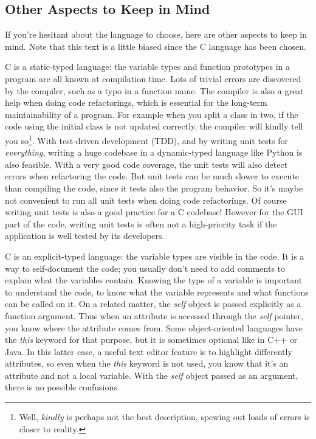 \subsection{Other Aspects to Keep in Mind}
If you're hesitant about the language to choose, here are other aspects to keep in mind. Note that this text is a little biased since the C language has been chosen.

C is a static-typed language: the variable types and function prototypes in a program are all known at compilation time. Lots of trivial errors are discovered by the compiler, such as a typo in a function name. The compiler is also a great help when doing code refactorings, which is essential for the long-term maintainability of a program. For example when you split a class in two, if the code using the initial class is not updated correctly, the compiler will kindly tell you so\footnote{Well, \emph{kindly} is perhaps not the best description, spewing out loads of errors is closer to reality.}. With test-driven development (TDD), and by writing unit tests for \emph{everything}, writing a huge codebase in a dynamic-typed language like Python is also feasible. With a very good code coverage, the unit tests will also detect errors when refactoring the code. But unit tests can be much slower to execute than compiling the code, since it tests also the program behavior. So it's maybe not convenient to run all unit tests when doing code refactorings. Of course writing unit tests is also a good practice for a C codebase! However for the GUI part of the code, writing unit tests is often not a high-priority task if the application is well tested by its developers.

C is an explicit-typed language: the variable types are visible in the code. It is a way to self-document the code; you usually don't need to add comments to explain what the variables contain. Knowing the type of a variable is important to understand the code, to know what the variable represents and what functions can be called on it. On a related matter, the \emph{self} object is passed explicitly as a function argument. Thus when an attribute is accessed through the \emph{self} pointer, you know where the attribute comes from. Some object-oriented languages have the \emph{this} keyword for that purpose, but it is sometimes optional like in C++ or Java. In this latter case, a useful text editor feature is to highlight differently attributes, so even when the \emph{this} keyword is not used, you know that it's an attribute and not a local variable. With the \emph{self} object passed as an argument, there is no possible confusions.

